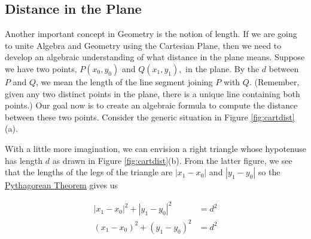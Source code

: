 \smallskip


\subsection*{Distance in the Plane}

Another important concept in Geometry is the notion of length.  If we are going to unite Algebra and Geometry using the Cartesian Plane, then we need to develop an algebraic understanding of what distance in the plane means.  Suppose we have two points, $P\left(x_{0}, y_{0}\right)$ and $Q\left(x_{1}, y_{1}\right),$ in the plane. By the   $d$  between $P$ and $Q$, we mean the length of the line segment joining $P$ with $Q$.  (Remember, given any two distinct points in the plane, there is a unique line containing both points.)  Our goal now is to create an algebraic formula to compute the distance between these two points. Consider the generic situation in Figure \ref{fig:cartdist}(a).

\medskip


\medskip

With a little more imagination, we can envision a right triangle whose hypotenuse has length $d$ as drawn in Figure \ref{fig:cartdist}(b).  From the latter figure, we see that the lengths of the legs of the triangle are $\left\lvert x_{1} - x_{0}\right\rvert$ and $\left\lvert y_{1} - y_{0}\right\rvert$ so the \href{http://en.wikipedia.org/wiki/Pythagorean_Theorem}{\underline{Pythagorean Theorem}} gives us
 
  \begin{align*}
   \left\lvert x_{1} - x_{0}\right\rvert^2 + \left\lvert y_{1} - y_{0}\right\rvert^2 &= d^2\\
   \left(x_{1} - x_{0}\right)^2 + \left(y_{1} - y_{0}\right)^2 &= d^2
  \end{align*}
 

